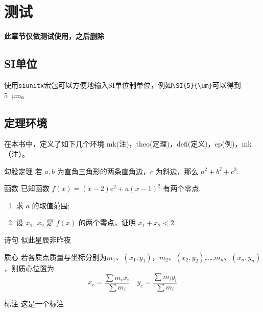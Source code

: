 \documentclass{gbook}
\begin{document}
\newpage


\setcounter{page}{1}

\tableofcontents

\newpage

\setcounter{page}{1}










\chapter{测试}

\textbf{此章节仅做测试使用，之后删除}

\section{SI单位}

使用\verb+siunitx+宏包可以方便地输入SI单位制单位，例如\verb+\SI{5}{\um}+可以得到\SI{5}{\um}。

\section{定理环境}

在本书中，定义了如下几个环境
mk(注)，theo(定理)，defi(定义)，ep(例)，mk（注）。

\begin{theo}{勾股定理}{}
若 $a,b$ 为直角三角形的两条直角边，$c$ 为斜边，那么 $a^2 + b^2 + c^2.$
\end{theo}

\begin{qu}{函数}{}
已知函数 $ f(x) = (x - 2)\mathrm{e}^{2} + a (x - 1)^{2} $ 有两个零点.
\begin{enumerate}[label=(\arabic*)]
  \item 求 $ a $ 的取值范围;
  \item 设 $ x_{1} $, $ x_{2} $ 是 $ f(x) $ 的两个零点，证明 $ x_{1} + x_{2} < 2 $.
\end{enumerate}
\end{qu}

\begin{ep}{诗句}{}
似此星辰非昨夜
\end{ep}

\begin{defi}{质心}{}
若各质点质量与坐标分别为$m_1$、$(x_1,y_1)$，$m_2$、$(x_2,y_2)$……$m_n$、$(x_n,y_n)$，则质心位置为
$$x_c = \frac{\sum m_i x_i}{\sum m_i} \quad y_c = \frac{\sum m_i y_i}{\sum m_i}$$
\end{defi}

\begin{mk}{标注}{}
这是一个标注
\end{mk}
\end{document}
